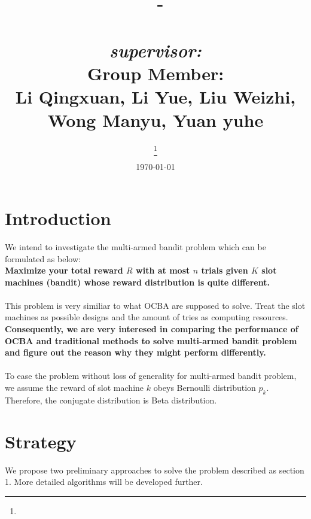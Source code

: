 \documentclass{article}
\title{
\vspace{2in}
\textmd{\textbf{\hmwkClassID \ - \hmwkClassName}}\\
\textmd{\textbf{\hmwkTitle}}\\
\vspace{0.1in}\large{\textit{supervisor: \hmwkClassInstructor}}\\
\vspace{1in}
\textmd{\textbf{Group Member:} \\ \vspace{0.2in} Li Qingxuan, Li Yue, Liu Weizhi,\\ Wong Manyu, Yuan yuhe}
\vspace{1.5in}
}
\author{\textbf{\hmwkAuthorName} \thanks{\hmwkAuthorEmail}}
\affil{Department of Industrial \& Systems Engineering \\ National University of Singapore}
\date{\today} %
\begin{document}
\maketitle




\newpage

\section{Introduction}
We intend to investigate the multi-armed bandit problem which can be formulated as below: \\
\textbf{Maximize your total reward $R$ with at most $n$ trials given $K$ slot machines (bandit) whose reward distribution is quite different.}\\
\\
This problem is very similiar to what OCBA are supposed to solve. Treat the slot machines as possible designs and the amount of tries as computing resources. \textbf{Consequently, we are very interesed in comparing the performance of OCBA and traditional methods to solve multi-armed bandit problem and figure out the reason why they might perform differently.}\\
\\
To ease the problem without loss of generality for multi-armed bandit problem, we assume the reward of slot machine $k$ obeys Bernoulli distribution $p_{k}$. Therefore, the conjugate distribution is Beta distribution.
\section{Strategy}
We propose two preliminary approaches to solve the problem described as section 1. More detailed algorithms will be developed further. 
\end{document}

